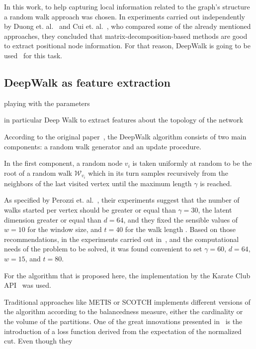 In this work, to help capturing local information related to the graph's structure a random walk approach was chosen. In experiments carried out independently by Duong et. al.~\cite{onnodefeatures} and Cui et. al.~\cite{onpositional}, who compared some of the already mentioned approaches, they concluded that matrix-decomposition-based methods are good to extract positional node information. For that reason, DeepWalk is going to be used~\cite{deepwalk} for this task.


\subsection{DeepWalk as feature extraction}

playing with the parameters

in particular Deep Walk to extract features about the topology of the network

According to the original paper~\cite{deepwalk}, the DeepWalk algorithm consists of two main components: a random walk generator and an update procedure. 

In the first component, a random node $v_i$ is taken uniformly at random to be the root of a random walk $\mathcal W_{v_i}$ which in its turn samples recursively from the neighbors of the last visited vertex until the maximum length $\gamma$ is reached.

As specified by Perozzi et. al.~\cite{deepwalk}, their experiments suggest that the number of walks started per vertex should be greater or equal than $\gamma=30$, the latent dimension greater or equal than $d=64$, and they fixed the sensible values of $w=10$ for the window size, and $t=40$ for the walk length . Based on those recommendations, in the experiments carried out in~\cite{deepwalk_hyper}, and the computational needs of the problem to be solved, it was found convenient to set $\gamma=60$, $d=64$, $w=15$, and $t=80$.


For the algorithm that is proposed here, the implementation by the Karate Club API~\cite{karateclub} was used.

Traditional approaches like METIS or SCOTCH implements different versions of the algorithm according to the balancedness measure, either the cardinality or the volume of the partitions. One of the great innovations presented  in~\cite{gap} is the introduction of a loss function derived from the expectation of the normalized cut. Even though they 

